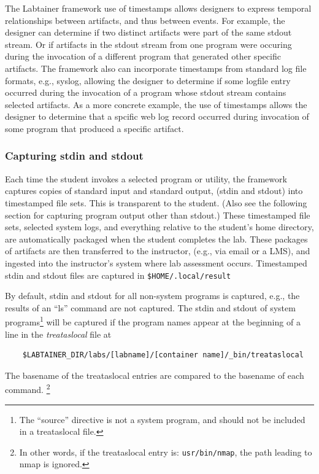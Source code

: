\documentclass[12pt]{article}
\begin{document}
The Labtainer framework use of timestamps allows designers to express temporal 
relationships between artifacts, and thus between events.  For example, the designer can determine if
two distinct artifacts were part of the same stdout stream.  Or if artifacts in the stdout stream from one 
program were occuring during the invocation of a different program that generated other specific artifacts.  
The framework also can incorporate
timestamps from standard log file formats, e.g., syslog, allowing the designer to determine if some logfile
entry occurred during the invocation of a program whose stdout stream contains selected artifacts.
As a more concrete example, the use of timestamps allows the designer to determine that a spcific web log
record occurred during invocation of some program that produced a specific artifact.

\subsubsection{Capturing stdin and stdout}
\label{stdin and stdout}
Each time the student invokes a selected program or utility, the 
framework captures copies of standard input and standard output, (stdin and stdout) into timestamped file sets.
This is transparent to the student.  (Also see the following section for capturing
program output other than stdout.)  These timestamped file sets, selected system logs,  and everything relative to
the student's home directory, are automatically packaged when the student completes the lab.
These packages of artifacts are then transferred to the instructor, (e.g., via email or a LMS), and 
ingested into the instructor's system where lab assessment occurs. Timestamped stdin and stdout files
are captured in \texttt{\$HOME/.local/result}

By default, stdin and stdout for all non-system programs is captured, e.g., the results of an ``ls'' command
are not captured.  The stdin and stdout of system programs\footnote{The ``source'' directive is not a system
program, and should not be included in a treataslocal file.} will be captured if the program
names appear at the beginning of a line in the \textit{treataslocal} file at
\begin{verbatim}
    $LABTAINER_DIR/labs/[labname]/[container name]/_bin/treataslocal
\end{verbatim}
\noindent The basename of the treataslocal entries are compared to the basename of each command.
\footnote{In other words, if the treataslocal entry is: \texttt{usr/bin/nmap}, the path leading to nmap is ignored.}
\end{document}
